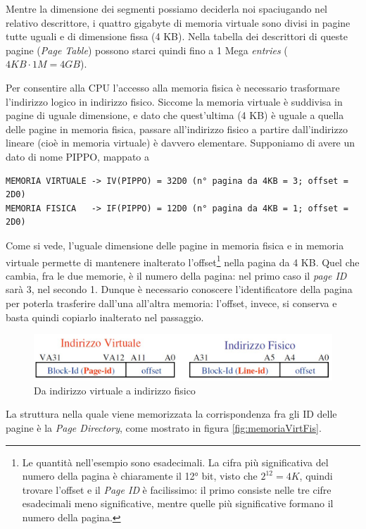 Mentre la dimensione dei segmenti possiamo deciderla noi spaciugando nel relativo descrittore, i quattro gigabyte di memoria virtuale sono divisi in pagine tutte uguali e di dimensione fissa (4 KB). Nella tabella dei descrittori di queste pagine (\textit{Page Table}) possono starci quindi fino a 1 Mega \textit{entries} ($4 KB \cdot 1 M = 4 GB$).

Per consentire alla CPU l'accesso alla memoria fisica è necessario trasformare l'indirizzo logico in indirizzo fisico. Siccome la memoria virtuale è suddivisa in pagine di uguale dimensione, e dato che quest'ultima (4 KB) è uguale a quella delle pagine in memoria fisica, passare all'indirizzo fisico a partire dall'indirizzo lineare (cioè in memoria virtuale) è davvero elementare. Supponiamo di avere un dato di nome PIPPO, mappato a
\begin{verbatim}
MEMORIA VIRTUALE -> IV(PIPPO) = 32D0 (n° pagina da 4KB = 3; offset = 2D0)
MEMORIA FISICA   -> IF(PIPPO) = 12D0 (n° pagina da 4KB = 1; offset = 2D0)
\end{verbatim}
Come si vede, l'uguale dimensione delle pagine in memoria fisica e in memoria virtuale permette di mantenere inalterato l'offset\footnote{Le quantità nell'esempio sono esadecimali. La cifra più significativa del numero della pagina è chiaramente il 12° bit, visto che $2^12 =4K$, quindi trovare l'offset e il \textit{Page ID} è facilissimo: il primo consiste nelle tre cifre esadecimali meno significative, mentre quelle più significative formano il numero della pagina.} nella pagina da 4 KB. Quel che cambia, fra le due memorie, è il numero della pagina: nel primo caso il \textit{page ID} sarà 3, nel secondo 1. Dunque è necessario conoscere l'identificatore della pagina per poterla trasferire dall'una all'altra memoria: l'offset, invece, si conserva e basta quindi copiarlo inalterato nel passaggio.

\begin{figure}[!h]
\centering
\includegraphics[width=0.75\columnwidth]{img/ivif}
\caption{Da indirizzo virtuale a indirizzo fisico}
\label{fig:ivif}
\end{figure}

La struttura nella quale viene memorizzata la corrispondenza fra gli ID delle pagine è la \textit{Page Directory}, come mostrato in figura \ref{fig:memoriaVirtFis}.

